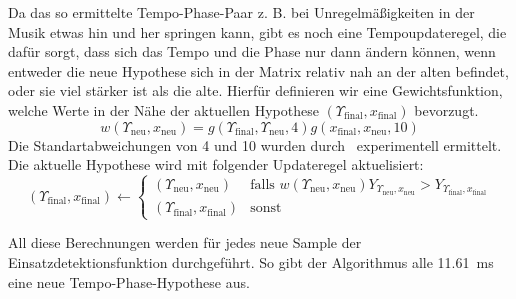 {{{			%
			Da das so ermittelte Tempo-Phase-Paar  z. B. bei Unregelmä{\ss}igkeiten in der Musik etwas hin und her springen kann,
				gibt es noch eine Tempoupdateregel,
				die dafür sorgt,
				dass sich das Tempo und die Phase nur dann ändern können,
				wenn entweder die neue Hypothese sich in der Matrix relativ nah an der alten befindet,
				oder sie viel stärker ist als die alte.
			Hierfür definieren wir eine Gewichtsfunktion,
				welche Werte in der Nähe der aktuellen Hypothese $(\Upsilon_\text{final}, x_\text{final})$ bevorzugt.
			\begin{equation}
				w(\Upsilon_{\text{neu}}, x_{\text{neu}}) =
					g(\Upsilon_\text{final}, \Upsilon_{\text{neu}}, 4)
					g(x_\text{final}, x_{\text{neu}}, 10)
			\end{equation}
			Die Standartabweichungen von \num{4} und \num{10} wurden durch~\cite{2011_PlRoSt} experimentell ermittelt.
			Die aktuelle Hypothese wird mit folgender Updateregel aktuelisiert:
			\begin{equation}
				(\Upsilon_\text{final}, x_\text{final}) \leftarrow
				\begin{cases}
					(\Upsilon_{\text{neu}}, x_{\text{neu}}) &
						\text{falls } w(\Upsilon_{\text{neu}}, x_{\text{neu}}) Y_{\Upsilon_{\text{neu}}, x_{\text{neu}}} >
							Y_{\Upsilon_\text{final}, x_\text{final}} \\
					(\Upsilon_\text{final}, x_\text{final}) &
						\text{sonst}
				\end{cases}
			\end{equation}

			All diese Berechnungen werden für jedes neue Sample der Einsatzdetektionsfunktion durchgeführt.
			So gibt der Algorithmus alle \SI{11.61}{\milli\second} eine neue Tempo-Phase-Hypothese aus.
		}
	}
}
